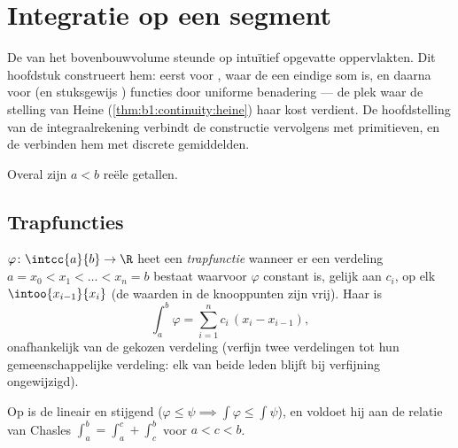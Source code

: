 \chapter{Integratie op een segment}\label{ch:b1:integration}

De  van het bovenbouwvolume steunde op intuïtief opgevatte
oppervlakten. Dit hoofdstuk construeert hem: eerst voor
, waar de  een eindige som is, en daarna voor
 (en stuksgewijs ) functies door uniforme
benadering --- de plek waar de stelling van Heine
(\cref{thm:b1:continuity:heine}) haar kost verdient. De
hoofdstelling van de integraalrekening verbindt de constructie
vervolgens met primitieven, en de  verbinden hem met
discrete gemiddelden.

Overal zijn $a < b$ reële getallen.

\section{Trapfuncties}

\begin{definition}\label{def:b1:integration:step}
$\varphi \colon \intcc{a}{b} \to \R$ heet een
\emph{trapfunctie} wanneer er een verdeling $a =
x_0 < x_1 < \dots < x_n = b$ bestaat waarvoor $\varphi$ constant is,
gelijk aan $c_i$, op elk   $\intoo{x_{i-1}}{x_i}$ (de
waarden in de knooppunten zijn vrij). Haar  is
\[
\int_a^b \varphi = \sum_{i=1}^{n} c_i\,(x_i - x_{i-1}),
\]
onafhankelijk van de gekozen verdeling (verfijn twee verdelingen tot
hun gemeenschappelijke verdeling: elk van beide leden blijft bij
verfijning ongewijzigd).
\end{definition}

\begin{proposition}\label{prop:b1:integration:stepprops}
Op  is de  lineair en stijgend ($\varphi \leq
\psi \implies \int\varphi \leq \int\psi$), en voldoet hij aan de
relatie van Chasles $\int_a^b = \int_a^c + \int_c^b$ voor $a < c <
b$.
\end{proposition}

